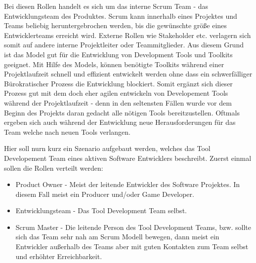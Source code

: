 \documentclass[pagesize, paper=a4, fontsize=12pt,titlepage=true, headings=small, headnosepline, abstractoff, liststotoc, nochapterprefix, plainheadsepline, twoside]{scrreprt}
\begin{document}
Bei diesen Rollen handelt es sich um das interne Scrum Team - das Entwicklungsteam des Produktes. Scrum kann innerhalb eines Projektes und Teams beliebig heruntergebrochen werden, bis die gewünschte größe eines Entwicklerteams erreicht wird. Externe Rollen wie Stakeholder etc. verlagern sich somit auf andere interne Projektleiter oder Teammitglieder. Aus diesem Grund ist das Model gut für die Entwicklung von Development Tools und Toolkits geeignet. Mit Hilfe des Models, können benötigte Toolkits während einer Projektlaufzeit schnell und effizient entwickelt werden ohne dass ein schwerfälliger Bürokratischer Prozess die Entwicklung blockiert. Somit ergänzt sich dieser Prozess gut mit dem doch eher agilen entwickeln von Developement Tools während der Projektlaufzeit - denn in den seltensten Fällen wurde vor dem Beginn des Projekts daran gedacht alle nötigen Tools bereitzustellen. Oftmals ergeben sich auch während der Entwicklung neue Herausforderungen für das Team welche nach neuen Tools verlangen.

Hier soll nurn kurz ein Szenario aufgebaut werden, welches das Tool Developement Team eines aktiven Software Entwicklers beschreibt. Zuerst einmal sollen die Rollen verteilt werden:

\begin{itemize}
\item Product Owner - Meist der leitende Entwickler des Software Projektes. In diesem Fall meist ein Producer und/oder Game Developer.
\item Entwicklungsteam - Das Tool Development Team selbst.
\item Scrum Master - Die leitende Person des Tool Development Teams, bzw. sollte sich das Team sehr nah am Scrum Modell bewegen, dann meist ein Entwickler außerhalb des Teams aber mit guten Kontakten zum Team selbst und erhöhter Erreichbarkeit.
\end{itemize}
\end{document}
